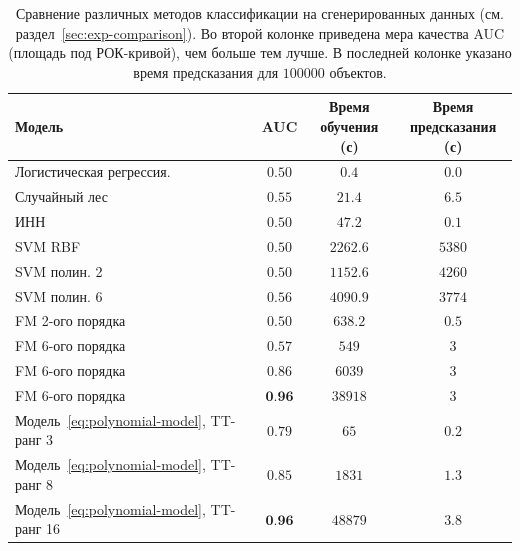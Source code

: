 %
\begin{table}[t]
\caption{Сравнение различных методов классификации на сгенерированных данных (см. раздел~\ref{sec:exp-comparison}).
Во второй колонке приведена мера качества AUC (площадь под РОК-кривой), чем больше тем лучше. В последней колонке указано время предсказания для $100000$ объектов.}
\label{tbl:synthetic-comparison}
\begin{center}
\begin{tabular}{l*{3}{c}}
\hline
Модель & AUC &
\parbox{3cm}{Время \\обучения (с)} &
\parbox{3.8cm}{Время \\предсказания (с)} \\[0.2cm]
\hline
Логистическая регрессия. & $0.50$ & $0.4$ & $0.0$ \\
Случайный лес & $0.55$ & $21.4$ & $6.5$ \\
ИНН & $0.50$ & $47.2$ & $0.1$ \\
SVM RBF & $0.50$ & $2262.6$ & $5380$ \\
SVM полин. 2 & $0.50$ & $1152.6$ & $4260$ \\
SVM полин. 6 & $0.56$ & $4090.9$ & $3774$ \\
FM 2-ого порядка & $0.50$ & $638.2$ & $0.5$ \\
FM 6-ого порядка & $0.57$ & $549$ & $3$ \\
FM 6-ого порядка & $0.86$ & $6039$ & $3$ \\
FM 6-ого порядка & $\textbf{0.96}$ & $38918$ & $3$ \\
Модель~\eqref{eq:polynomial-model}, TT-ранг 3 & $0.79$ & $65$ & $0.2$ \\
Модель~\eqref{eq:polynomial-model}, TT-ранг 8 & $0.85$ & $1831$ & $1.3$ \\
Модель~\eqref{eq:polynomial-model}, TT-ранг 16 & $\textbf{0.96}$ & $48879$ & $3.8$ \\
\hline
\end{tabular}
\end{center}
\end{table}
